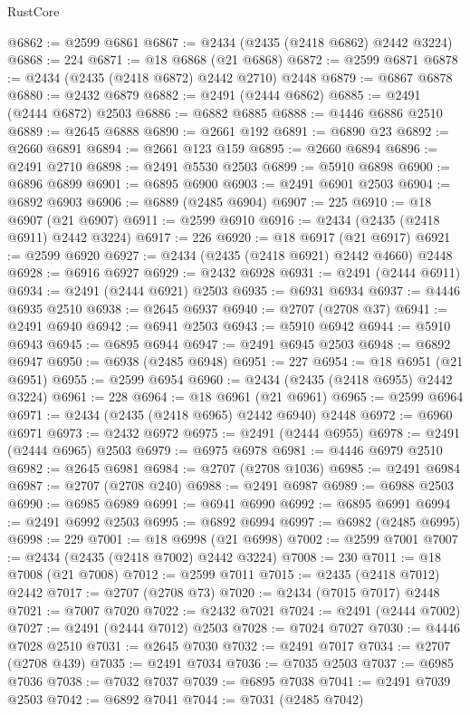\begin{lexlean}{RustCore}
\begin{coremodule}
@6862 := @2599 @6861
@6867 := @2434 (@2435 (@2418 @6862) @2442 @3224)
@6868 := 224
@6871 := @18 @6868 (@21 @6868)
@6872 := @2599 @6871
@6878 := @2434 (@2435 (@2418 @6872) @2442 @2710) @2448
@6879 := @6867 @6878
@6880 := @2432 @6879
@6882 := @2491 (@2444 @6862)
@6885 := @2491 (@2444 @6872) @2503
@6886 := @6882 @6885
@6888 := @4446 @6886 @2510
@6889 := @2645 @6888
@6890 := @2661 @192
@6891 := @6890 @23
@6892 := @2660 @6891
@6894 := @2661 @123 @159
@6895 := @2660 @6894
@6896 := @2491 @2710
@6898 := @2491 @5530 @2503
@6899 := @5910 @6898
@6900 := @6896 @6899
@6901 := @6895 @6900
@6903 := @2491 @6901 @2503
@6904 := @6892 @6903
@6906 := @6889 (@2485 @6904)
@6907 := 225
@6910 := @18 @6907 (@21 @6907)
@6911 := @2599 @6910
@6916 := @2434 (@2435 (@2418 @6911) @2442 @3224)
@6917 := 226
@6920 := @18 @6917 (@21 @6917)
@6921 := @2599 @6920
@6927 := @2434 (@2435 (@2418 @6921) @2442 @4660) @2448
@6928 := @6916 @6927
@6929 := @2432 @6928
@6931 := @2491 (@2444 @6911)
@6934 := @2491 (@2444 @6921) @2503
@6935 := @6931 @6934
@6937 := @4446 @6935 @2510
@6938 := @2645 @6937
@6940 := @2707 (@2708 @37)
@6941 := @2491 @6940
@6942 := @6941 @2503
@6943 := @5910 @6942
@6944 := @5910 @6943
@6945 := @6895 @6944
@6947 := @2491 @6945 @2503
@6948 := @6892 @6947
@6950 := @6938 (@2485 @6948)
@6951 := 227
@6954 := @18 @6951 (@21 @6951)
@6955 := @2599 @6954
@6960 := @2434 (@2435 (@2418 @6955) @2442 @3224)
@6961 := 228
@6964 := @18 @6961 (@21 @6961)
@6965 := @2599 @6964
@6971 := @2434 (@2435 (@2418 @6965) @2442 @6940) @2448
@6972 := @6960 @6971
@6973 := @2432 @6972
@6975 := @2491 (@2444 @6955)
@6978 := @2491 (@2444 @6965) @2503
@6979 := @6975 @6978
@6981 := @4446 @6979 @2510
@6982 := @2645 @6981
@6984 := @2707 (@2708 @1036)
@6985 := @2491 @6984
@6987 := @2707 (@2708 @240)
@6988 := @2491 @6987
@6989 := @6988 @2503
@6990 := @6985 @6989
@6991 := @6941 @6990
@6992 := @6895 @6991
@6994 := @2491 @6992 @2503
@6995 := @6892 @6994
@6997 := @6982 (@2485 @6995)
@6998 := 229
@7001 := @18 @6998 (@21 @6998)
@7002 := @2599 @7001
@7007 := @2434 (@2435 (@2418 @7002) @2442 @3224)
@7008 := 230
@7011 := @18 @7008 (@21 @7008)
@7012 := @2599 @7011
@7015 := @2435 (@2418 @7012) @2442
@7017 := @2707 (@2708 @73)
@7020 := @2434 (@7015 @7017) @2448
@7021 := @7007 @7020
@7022 := @2432 @7021
@7024 := @2491 (@2444 @7002)
@7027 := @2491 (@2444 @7012) @2503
@7028 := @7024 @7027
@7030 := @4446 @7028 @2510
@7031 := @2645 @7030
@7032 := @2491 @7017
@7034 := @2707 (@2708 @439)
@7035 := @2491 @7034
@7036 := @7035 @2503
@7037 := @6985 @7036
@7038 := @7032 @7037
@7039 := @6895 @7038
@7041 := @2491 @7039 @2503
@7042 := @6892 @7041
@7044 := @7031 (@2485 @7042)

\end{coremodule}
\end{lexlean}
